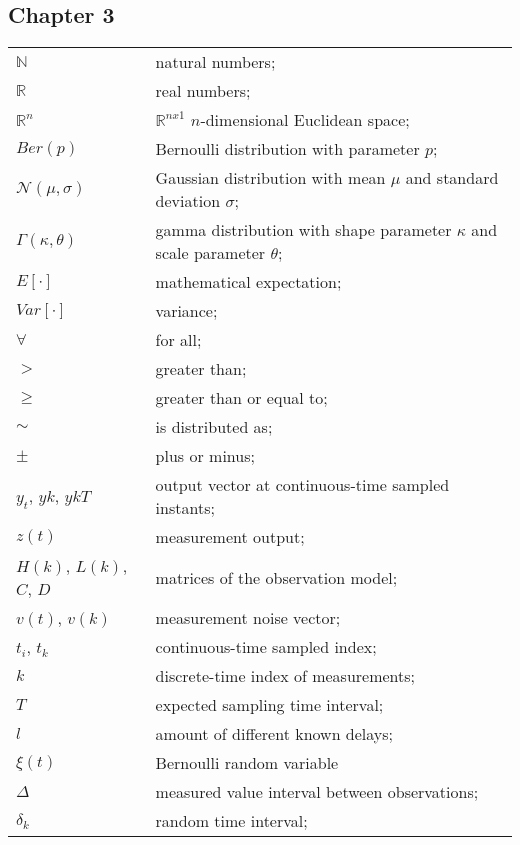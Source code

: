 \subsection*{Chapter 3}

\begin{longtable}{ll}
	$\mathbb{N}$			& natural numbers; \\
	$\mathbb{R}$			& real numbers; \\
	$\mathbb{R}^n$			& $\mathbb{R}^{nx1}$ $n$-dimensional Euclidean space; \\
	
	$Ber(p)$				& Bernoulli distribution with parameter $p$; \\
	$\mathcal{N}(\mu,\sigma)$ & Gaussian distribution with mean $\mu$ and standard deviation $\sigma$; \\
	$\Gamma(\kappa,\theta)$	& gamma distribution with shape parameter $\kappa$ and scale parameter $\theta$; \\
	$E[\mathord{\cdot}]$	& mathematical expectation; \\
	$Var[\mathord{\cdot}]$	& variance; \\
	
	$\forall$				& for all; \\
	$>$						& greater than; \\
	$\geq$					& greater than or equal to; \\
	$\sim$					& is distributed as; \\
	$\pm$					& plus or minus; \\
	
	$y_{t}$, $y{k}$, $y{kT}$& output vector at continuous-time sampled instants;\\
	$z(t)$					& measurement output; \\
	$H(k)$, $L(k)$, $C$, $D$& matrices of the observation model; \\
	$v(t)$, $v(k)$			& measurement noise vector; \\
	$t_i$, $t_k$			& continuous-time sampled index; \\
	$k$						& discrete-time index of measurements;  \\
	$T$						& expected sampling time interval; \\
	$l$						& amount of different known delays; \\
	$\xi(t)$				& Bernoulli random variable \\

	$\Delta$				& measured value interval between observations; \\
	$\delta_k$				& random time interval; \\
	

\end{longtable}
